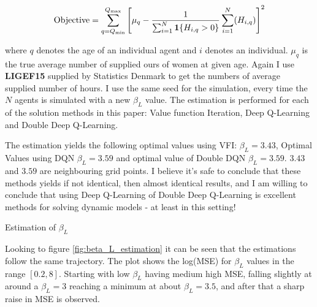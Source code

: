 \begin{equation}
    \text{Objective} = \sum_{q=Q_{\min}}^{Q_{\max}} \left[ \mu_{q} -\frac{1}{\sum_{i=1}^{N} \mathbf{1}\{H_{i,q} > 0\}}\sum_{i=1}^N (H_{i,q})\right]^2
\end{equation}

where $q$ denotes the age of an individual agent and $i$ denotes an individual. $\mu_q$ is the true average number of supplied ours of women at given age. Again I use \textbf{LIGEF15} supplied by Statistics Denmark to get the numbers of average supplied number of hours. I use the same seed for the simulation, every time the $N$ agents is simulated with a new $\beta_L$ value. The estimation is performed for each of the solution methods in this paper: Value function Iteration, Deep Q-Learning and Double Deep Q-Learning. 

The estimation yields the following optimal values using VFI: $\beta_L=3.43$, Optimal Values using DQN $\beta_L=3.59$ and optimal value of Double DQN $\beta_L=3.59$. $3.43$ and $3.59$ are neighbouring grid points. I believe it's safe to conclude that these methods yields if not identical, then almost identical results, and I am willing to conclude that using Deep Q-Learning of Double Deep Q-Learning is excellent methods for solving dynamic models - at least in this setting!

\begin{table}[ht]
    \centering
    
    \caption{Estimation of $\beta_L$}
    \label{tab:beta_L_Estimation}
\end{table}

Looking to figure \ref{fig:beta_L_estimation} it can be seen that the estimations follow the same trajectory. The plot shows the log(MSE) for $\beta_L$ values in the range $[0.2, 8]$. Starting with low $\beta_L$ having medium high MSE, falling slightly at around a $\beta_L = 3$ reaching a minimum at about $\beta_L = 3.5$, and after that a sharp raise in MSE is observed. 

